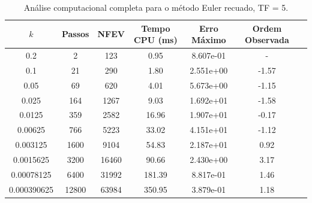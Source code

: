 \begin{table}[H]
    \centering
    \begin{tabular}{ccccccc}
        \hline
        $k$ & Passos & NFEV & Tempo CPU (ms) & Erro Máximo & Ordem Observada \\
        \hline
        0.2 & 2 & 123 & 0.95  & 8.607e-01 & - \\
        0.1 & 21 & 290 & 1.80  & 2.551e+00 & -1.57 \\
        0.05 & 69 & 620 & 4.01  & 5.673e+00 & -1.15 \\
        0.025 & 164 & 1267 & 9.03  & 1.692e+01 & -1.58 \\
        0.0125 & 359 & 2582 & 16.96  & 1.907e+01 & -0.17 \\
        0.00625 & 766 & 5223 & 33.02  & 4.151e+01 & -1.12 \\
        0.003125 & 1600 & 9104 & 54.83  & 2.187e+01 & 0.92 \\
        0.0015625 & 3200 & 16460 & 90.66  & 2.430e+00 & 3.17 \\
        0.00078125 & 6400 & 31992 & 181.39  & 8.817e-01 & 1.46 \\
        0.000390625 & 12800 & 63984 & 350.95  & 3.879e-01 & 1.18 \\
        \hline
    \end{tabular}
    \caption{Análise computacional completa para o método Euler recuado, TF = 5.}
    \label{tab:erros_euler_recuado,_tf_=_5}
\end{table}
